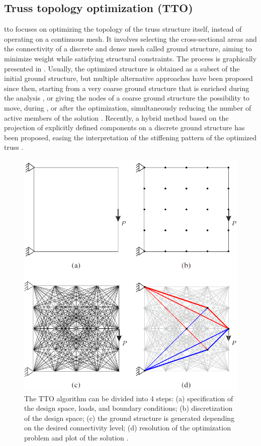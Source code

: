 \subsection{Truss topology optimization (TTO)}
\acrfull{tto} focuses on optimizing the topology of the truss structure itself, instead of operating on a continuous mesh. It involves selecting the cross-sectional areas and the connectivity of a discrete and dense mesh called ground structure, aiming to minimize weight while satisfying structural constraints. The process is graphically presented in . Usually, the optimized structure is obtained as a subset of the initial ground structure, but multiple alternative approaches have been proposed since then, \eg starting from a very coarse ground structure that is enriched during the analysis , or giving the nodes of a coarse ground structure the possibility to move, during , or after the optimization, simultaneously reducing the number of active members of the solution . Recently, a hybrid method based on the projection of explicitly defined components on a discrete ground structure has been proposed, easing the interpretation of the stiffening pattern of the optimized truss .

\begin{figure}
    \centering
    \includegraphics[width=0.7\linewidth]{figures/02_literature/layopt.png}
    \caption{The TTO algorithm can be divided into 4 steps: (a)
    specification of the design space, loads, and boundary conditions; (b) discretization
    of the design space; (c) the ground structure is generated depending on the
    desired connectivity level; (d) resolution of the optimization problem and plot of
    the solution \cite{he_python_2019}.}
    \label{fig:02_tto_ex}
\end{figure}

